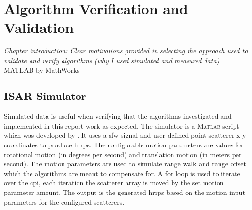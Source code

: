 \documentclass[class=report,11pt,crop=false]{standalone}
\begin{document}
\ifstandalone
\tableofcontents
\fi
\chapter{Algorithm Verification and Validation \label{ch:algorithmV&V}}

 

\emph{Chapter introduction: Clear motivations provided in selecting the approach used to validate and verify algorithms (why I used simulated and measured data)}
\textsc{MATLAB} by MathWorks \cite{mathworks}
\section{ISAR Simulator}
Simulated data is useful when verifying that the algorithms investigated and implemented in this report work as expected. The simulator is a \textsc{Matlab} script which was developed by \cite{matlab}. It uses a \gls{sfw} signal and user defined point scatterer x-y coordinates to produce \gls{hrrp}s. The configurable motion parameters are values for rotational motion (in degrees per second) and translation motion (in meters per second). The motion parameters are used to simulate range walk and range offset which the algorithms are meant to compensate for. A for loop is used to iterate over the \gls{cpi}, each iteration the scatterer array is moved by the set motion parameter amount. The output is the generated \gls{hrrp}s based on the motion input parameters for the configured scatterers.
\end{document}
